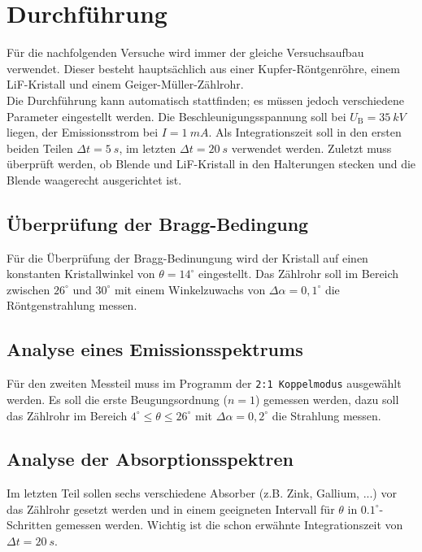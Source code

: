 \section{Durchführung}
\label{sec:Durchführung}
Für die nachfolgenden Versuche wird immer der gleiche Versuchsaufbau verwendet. Dieser
besteht hauptsächlich aus einer Kupfer-Röntgenröhre, einem LiF-Kristall und einem
Geiger-Müller-Zählrohr.
\\
Die Durchführung kann automatisch stattfinden; es müssen jedoch verschiedene Parameter
eingestellt werden. Die Beschleunigungsspannung soll bei $U_\text{B}=\SI{35}{kV}$ liegen,
der Emissionsstrom bei $I = \SI{1}{mA}$. Als Integrationszeit soll in den ersten beiden
Teilen  $\Delta t = \SI{5}{s}$, im letzten $\Delta t = \SI{20}{s}$ verwendet werden. 
Zuletzt muss überprüft werden, ob Blende und LiF-Kristall in
den Halterungen stecken und die Blende waagerecht ausgerichtet ist.

\subsection{Überprüfung der Bragg-Bedingung}
\label{sec:Überprüfung der Bragg-Bedingung}
Für die Überprüfung der Bragg-Bedinungung wird der Kristall auf einen konstanten
Kristallwinkel von $\theta = 14^\circ$ eingestellt. Das Zählrohr soll im Bereich zwischen
$26^\circ$ und $30^\circ$ mit einem Winkelzuwachs von $\Delta \alpha = 0,1^\circ$ die
Röntgenstrahlung messen.

\subsection{Analyse eines Emissionsspektrums}
\label{sec:Analyse eines Emissionsspektrums}
Für den zweiten Messteil muss im Programm der \texttt{2:1 Koppelmodus} ausgewählt werden.
Es soll die erste Beugungsordnung ($n=1$) gemessen werden, dazu soll das Zählrohr im
Bereich $4^\circ \leq \theta \leq 26^\circ$ mit $\Delta \alpha = 0,2^\circ$ die Strahlung
messen.

\subsection{Analyse der Absorptionsspektren}
\label{sec:Analyse der Absorptionsspektren}
Im letzten Teil sollen sechs verschiedene Absorber (z.B. Zink, Gallium, ...) vor das
Zählrohr gesetzt werden und in einem geeigneten Intervall für $\theta$ in
$0.1^\circ$-Schritten gemessen werden. Wichtig ist die schon erwähnte Integrationszeit von
$\Delta t = \SI{20}{s}$.

